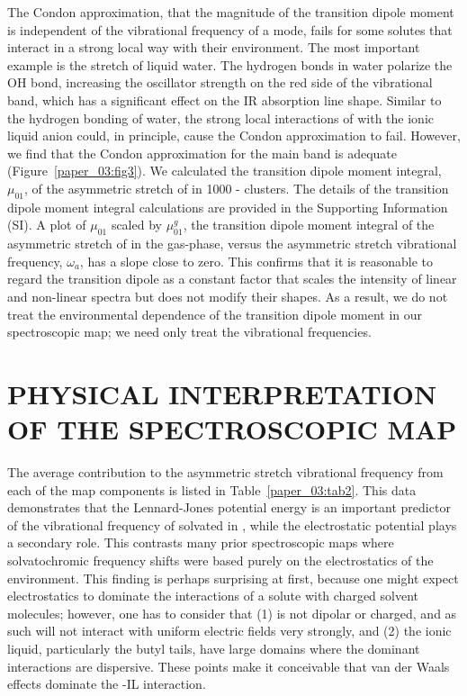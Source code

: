 \documentclass[%
  class = book,%
  crop = false,%
  float = true,%
  multi = true,%
  preview = false,%
]{standalone}
\let\cite\autocite
\newcommand{\caps}[1]{\uppercase{#1}}
\begin{document}
The Condon approximation, that the magnitude of the transition dipole moment is independent of the vibrational frequency of a mode, fails for some solutes that interact in a strong local way with their environment. The most important example is the  stretch of liquid water. The hydrogen bonds in water polarize the OH bond, increasing the oscillator strength on the red side of the vibrational band, which has a significant effect on the IR absorption line shape.\cite{corcelliJPCA-05,schmidt_pronounced_2005-1,loparoCP-07} Similar to the hydrogen bonding of water, the strong local interactions of  with the ionic liquid anion could, in principle, cause the Condon approximation to fail. However, we find that the Condon approximation for the main band is adequate (Figure~\ref{paper_03:fig3}). We calculated the transition dipole moment integral, \(\mu_{01}\), of the asymmetric stretch of  in \num{1000} -\ce{[C4C1im][PF6]} clusters. The details of the transition dipole moment integral calculations are provided in the Supporting Information (SI). A plot of \(\mu_{01}\) scaled by \(\mu_{01}^{g}\), the transition dipole moment integral of the asymmetric stretch of  in the gas-phase, versus the asymmetric stretch vibrational frequency, \(\omega_{a}\), has a slope close to zero. This confirms that it is reasonable to regard the transition dipole as a constant factor that scales the intensity of linear and non-linear spectra but does not modify their shapes. As a result, we do not treat the environmental dependence of the transition dipole moment in our spectroscopic map; we need only treat the vibrational frequencies.

\section{\texorpdfstring{\caps{Physical Interpretation of the Spectroscopic Map}}{Physical Interpretation of the Spectroscopic Map}}
\label{paper_03:sec:IV}

The average contribution to the  asymmetric stretch vibrational frequency from each of the map components is listed in Table~\ref{paper_03:tab2}. This data demonstrates that the Lennard-Jones potential energy is an important predictor of the vibrational frequency of  solvated in \ce{[C4C1im][PF6]}, while the electrostatic potential plays a secondary role. This contrasts many prior spectroscopic maps where solvatochromic frequency shifts were based purely on the electrostatics of the environment.\cite{lin_water_2009-1,ohJCP-08,Miller2009} This finding is perhaps surprising at first, because one might expect electrostatics to dominate the interactions of a solute with charged solvent molecules; however, one has to consider that (1)  is not dipolar or charged, and as such will not interact with uniform electric fields very strongly, and (2) the ionic liquid, particularly the \ce{[C4C1im]+} butyl tails, have large domains where the dominant interactions are dispersive. These points make it conceivable that van der Waals effects dominate the -IL interaction.
\end{document}
